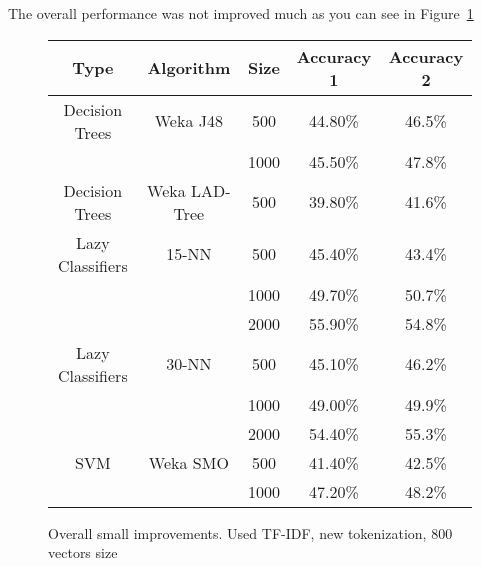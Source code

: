 The overall performance was not improved much as you can see in Figure~\ref{fig:performance}

\begin{figure}
\begin{center}
\begin{tabular}{|c|c|c|c|c|}
\hline
Type     &       Algorithm    & Size &   Accuracy 1 & Accuracy 2  \\ \hline
\hline
Decision Trees & Weka J48      &   500  &       44.80\%   &    46.5\% \\
                              &&  1000  &      45.50\%  &    47.8\%\\
Decision Trees & Weka LAD-Tree &   500  &      39.80\%  &    41.6\%\\

Lazy Classifiers & 15-NN &   500  &      45.40\% &    43.4\% \\
                              &&  1000  &      49.70\%  &    50.7\%\\
                              &&  2000  &      55.90\%  &    54.8\%\\
 
Lazy Classifiers & 30-NN  &   500  &      45.10\%  &    46.2\%\\
                              &&  1000  &      49.00\%  &    49.9\%\\
                              &&  2000  &      54.40\%  &    55.3\%\\


SVM & Weka SMO &   500  &      41.40\% &      42.5\% \\
                                     &&  1000  &      47.20\% &      48.2\% \\
\hline
\end{tabular}
\caption{\label{fig:performance} Overall small improvements. Used TF-IDF, new tokenization, 800 vectors size}
\end{center}
\end{figure}



